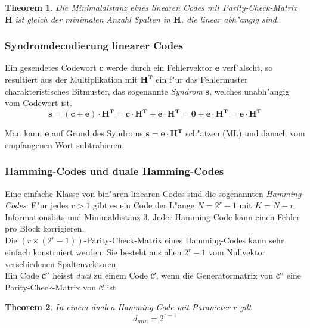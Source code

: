 \documentclass[german, 10pt, a4paper, twocolumn]{scrartcl}
\newtheorem{theorem}{Theorem}
\begin{document}
\begin{theorem}
	Die Minimaldistanz eines linearen Codes mit Parity-Check-Matrix $\mathbf{H}$ ist gleich der minimalen Anzahl Spalten in $\mathbf{H}$, die linear abh"angig sind.
\end{theorem}

\subsubsection{Syndromdecodierung linearer Codes}

Ein gesendetes Codewort $\mathbf{c}$ werde durch ein Fehlervektor $\mathbf{e}$ verf"alscht, so resultiert aus der Multiplikation mit $\mathbf{H^T}$ ein f"ur das Fehlermuster charakteristisches Bitmuster, das sogenannte \textit{Syndrom} $\mathbf{s}$, welches unabh"angig vom Codewort ist.
\begin{displaymath}
	\mathbf{s} = (\mathbf{c}+\mathbf{e})\cdotp \mathbf{H^T} = \mathbf{c}\cdotp \mathbf{H^T} +  \mathbf{e}\cdotp \mathbf{H^T} = \mathbf{0} +  \mathbf{e}\cdotp \mathbf{H^T} = \mathbf{e}\cdotp \mathbf{H^T}
\end{displaymath}

Man kann $\mathbf{e}$ auf Grund des Syndroms $\mathbf{s} = \mathbf{e}\cdotp \mathbf{H^T}$ sch"atzen (ML) und danach vom empfangenen Wort subtrahieren.

\subsubsection{Hamming-Codes und duale Hamming-Codes}

Eine einfache Klasse von bin"aren linearen Codes sind die sogenannten \textit{Hamming-Codes}. F"ur jedes $r > 1$ gibt es ein Code der L"ange $N=2^r-1$ mit $K=N-r$ Informationsbits und Minimaldistanz 3. Jeder Hamming-Code kann einen Fehler pro Block korrigieren.\\

Die $(r\times (2^r-1))$-Parity-Check-Matrix eines Hamming-Codes kann sehr einfach konstruiert werden. Sie besteht aus allen $2^r-1$ vom Nullvektor verschiedenen Spaltenvektoren.\\

Ein Code $\mathcal{C}'$ heisst \textit{dual} zu einem Code $\mathcal{C}$, wenn die Generatormatrix von $\mathcal{C}'$ eine Parity-Check-Matrix von $\mathcal{C}$ ist.

\begin{theorem}
	In einem dualen Hamming-Code mit Parameter $r$ gilt
	\begin{displaymath}
		d_{min} = 2^{r-1}
	\end{displaymath}
\end{theorem}
\end{document}
